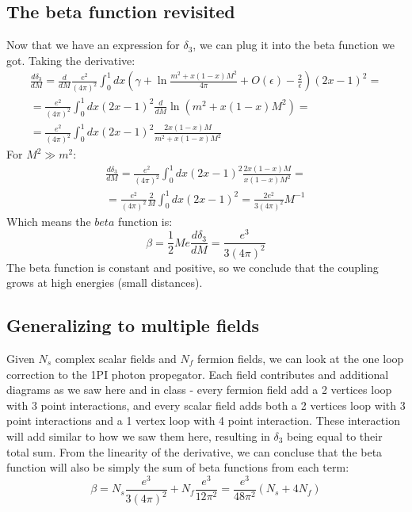 \documentclass{article}
\begin{document}
\subsection{The beta function revisited}
Now that we have an expression for $\delta_3$, we can plug it into the beta function we got. Taking the derivative:
\begin{equation}
\begin{gathered}
    \frac{d \delta_3}{dM} = \frac{d}{dM} \frac{e^2}{(4\pi)^2}\int_0^1 dx \left(\gamma + \ln \frac{m^2 + x(1 - x)M^2}{4\pi} + O(\epsilon) - \frac{2}{\epsilon}\right)(2x - 1)^2
    = \\ = \frac{e^2}{(4\pi)^2}\int_0^1 dx (2x - 1)^2 \frac{d}{dM}\ln(m^2 + x(1 - x)M^2)
    = \\ = \frac{e^2}{(4\pi)^2}\int_0^1 dx (2x - 1)^2 \frac{2x(1 - x)M}{m^2 + x(1 - x)M^2}
\end{gathered}
\end{equation}
For $M^2 \gg m^2$:
\begin{equation}
\begin{gathered}
    \frac{d \delta_3}{dM} = \frac{e^2}{(4\pi)^2}\int_0^1 dx (2x - 1)^2 \frac{2x(1 - x)M}{x(1 - x)M^2} = \\ =
    \frac{e^2}{(4\pi)^2}\frac{2}{M}\int_0^1 dx (2x - 1)^2 = 
    \frac{2e^2}{3(4\pi)^2}M^{-1}
\end{gathered}
\end{equation}
Which means the $beta$ function is:
\begin{equation}
    \beta = \frac{1}{2}Me \frac{d\delta_3}{dM} =
    \frac{e^3}{3(4\pi)^2}
\end{equation}
The beta function is constant and positive, so we conclude that the coupling grows at high energies (small distances).
\subsection{Generalizing to multiple fields}
Given $N_s$ complex scalar fields and $N_f$ fermion fields, we can look at the one loop correction to the 1PI photon propegator. Each field contributes and additional diagrams as we saw here and in class - every fermion field add a 2 vertices loop with 3 point interactions, and every scalar field adds both a 2 vertices loop with 3 point interactions and a 1 vertex loop with 4 point interaction. These interaction will add similar to how we saw them here, resulting in $\delta_3$ being equal to their total sum. From the linearity of the derivative, we can concluse that the beta function will also be simply the sum of beta functions from each term:
\begin{equation}
    \beta = N_s \frac{e^3}{3(4\pi)^2} + N_f \frac{e^3}{12\pi^2} = \frac{e^3}{48\pi^2}\left(N_s + 4 N_f\right)
\end{equation}
\end{document}
